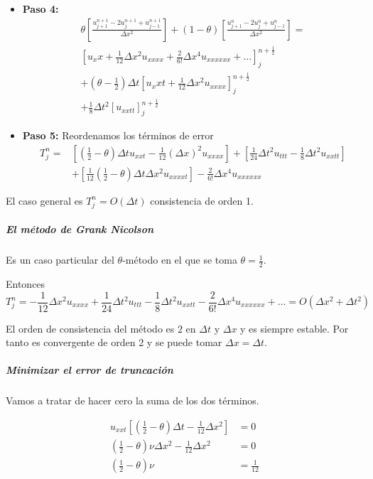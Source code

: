 \begin{itemize}
	\item \textbf{Paso 4: }
	\begin{align*}
	\theta\left[\frac{u_{j+1}^{n+1}-2u_{j}^{n+1}+u_{j-1}^{n+1}}{\Delta x ^2}\right] + (1 - \theta) \left[\frac{u_{j+1}^{n}-2u_{j}^{n}+u_{j-1}^{n}}{\Delta x ^2}\right] = \\
	\left[u_xx + \frac{1}{12}\Delta x^2 u_{xxxx} + \frac{2}{6!}\Delta x ^4 u_{xxxxxx}  + \hdots\right]_j^{n+\frac{1}{2}}\\
	+(\theta - \frac{1}{2})\Delta t \left[u_xxt + \frac{1}{12}\Delta x ^2 u_{xxxx}\right]_j^{n+\frac{1}{2}}\\
	+\frac{1}{8}\Delta t ^2\left[u_{xxtt}\right]_j^{n+\frac{1}{2}}
	\end{align*}
	
	\item \textbf{Paso 5: }	Reordenamos los términos de error
	\begin{align*}
	T_j^n = & \left[\left(\frac{1}{2}-\theta\right)\Delta t u_{xxt}- \frac{1}{12}(\Delta x)^2 u_{xxxx}\right]
	+ \left[\frac{1}{24}\Delta t^2 u_{ttt}-\frac{1}{8}\Delta t ^2 u_{xxtt}\right]\\
	& + \left[\frac{1}{12}\left(\frac{1}{2}-\theta\right)\Delta t \Delta x^2 u_{xxxxt}\right] - \frac{2}{6!}\Delta x ^4 u_{xxxxxx}
	\end{align*}

\end{itemize}

El caso general es $T_j^n = O(\Delta t)$ consistencia de orden 1.

\subparagraph{El método de Grank Nicolson}\mbox{}

Es un caso particular del  $\theta$-método en el que se toma $\theta = \frac{1}{2}$.

Entonces
$$T_j^n = -\frac{1}{12}\Delta x^2 u_{xxxx} + \frac{1}{24}\Delta t^2u_{ttt}-\frac{1}{8}\Delta t ^2u_{xxtt} - \frac{2}{6!}\Delta x ^4 u_{xxxxxx} + \hdots = O(\Delta x^2 + \Delta t ^2)$$

El orden de consistencia del método es $2$ en $\Delta t$ y $\Delta x$ y es siempre estable. Por tanto es convergente de orden 2 y se puede tomar $\Delta x = \Delta t$.

\subparagraph{Minimizar el error de truncación}\mbox{}

Vamos a tratar de hacer cero la suma de los dos términos.

\begin{align*}
u_{xxt}\left[\left(\frac{1}{2}-\theta\right)\Delta t - \frac{1}{12}\Delta x^2\right] & = 0\\
\left(\frac{1}{2}-\theta\right)\nu\Delta x^2 - \frac{1}{12}\Delta x^2  & = 0\\
\left(\frac{1}{2}-\theta\right)\nu & = \frac{1}{12}
\end{align*}

